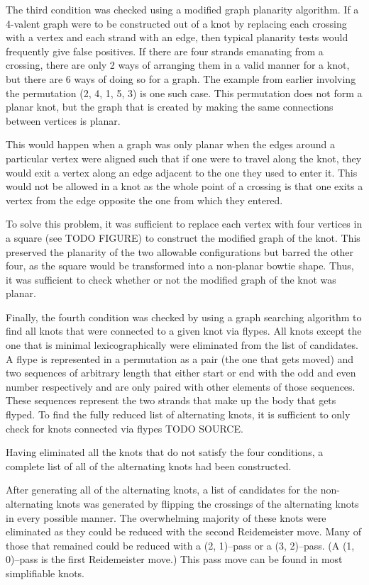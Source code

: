 \begin{paper}
The third condition was checked using a modified graph planarity algorithm.
If a 4-valent graph were to be constructed out of a knot by replacing each
crossing with a vertex and each strand with an edge, then typical planarity
tests would frequently give false positives.
If there are four strands emanating from a crossing, there are only 2 ways of
arranging them in a valid manner for a knot, but there are 6 ways of doing so
for a graph.
The example from earlier involving the permutation (2, 4, 1, 5, 3) is one such
case.
This permutation does not form a planar knot, but the graph that is created by
making the same connections between vertices is planar.

This would happen when a graph was only planar when the edges around a
particular vertex were aligned such that if one were to travel along the knot,
they would exit a vertex along an edge adjacent to the one they used to enter
it.
This would not be allowed in a knot as the whole point of a crossing is that one
exits a vertex from the edge opposite the one from which they entered.

To solve this problem, it was sufficient to replace each vertex with four
vertices in a square (see TODO FIGURE) to construct the modified graph of the
knot.
This preserved the planarity of the two allowable configurations but barred the
other four, as the square would be transformed into a non-planar bowtie shape.
Thus, it was sufficient to check whether or not the modified graph of the knot
was planar.

Finally, the fourth condition was checked by using a graph searching algorithm
to find all knots that were connected to a given knot via flypes.
All knots except the one that is minimal lexicographically were eliminated from
the list of candidates.
A flype is represented in a permutation as a pair (the one that gets moved) and
two sequences of arbitrary length that either start or end with the odd and even
number respectively and are only paired with other elements of those sequences.
These sequences represent the two strands that make up the body that gets
flyped.
To find the fully reduced list of alternating knots, it is sufficient to only
check for knots connected via flypes TODO SOURCE.

Having eliminated all the knots that do not satisfy the four conditions, a
complete list of all of the alternating knots had been constructed.


After generating all of the alternating knots, a list of candidates for the
non-alternating knots was generated by flipping the crossings of the alternating
knots in every possible manner.
The overwhelming majority of these knots were eliminated as they could be
reduced with the second Reidemeister move.
Many of those that remained could be reduced with a (2, 1)--pass or a
(3, 2)--pass.
(A (1, 0)--pass is the first Reidemeister move.)
This pass move can be found in most simplifiable knots.


\end{paper}
